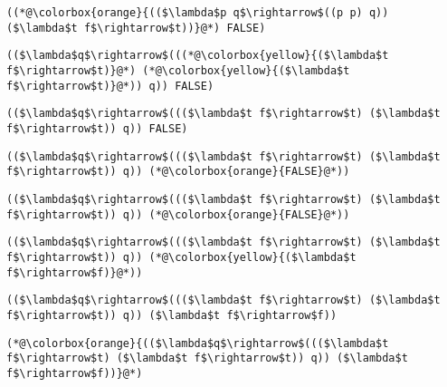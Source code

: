 \documentclass{beamer}
\begin{document}
\begin{frame}[fragile]{\CurrentSection}
\lstset{basicstyle=\ttfamily\small}\lstset{numbers=none}\lstset{language=ML}\begin{lstlisting}
((*@\colorbox{orange}{(($\lambda$p q$\rightarrow$((p p) q)) ($\lambda$t f$\rightarrow$t))}@*) FALSE)
\end{lstlisting}
\pause\lstset{language=ML}\begin{lstlisting}
(($\lambda$q$\rightarrow$(((*@\colorbox{yellow}{($\lambda$t f$\rightarrow$t)}@*) (*@\colorbox{yellow}{($\lambda$t f$\rightarrow$t)}@*)) q)) FALSE)
\end{lstlisting}

\end{frame}

\begin{frame}[fragile]{\CurrentSection}
\lstset{basicstyle=\ttfamily\small}\lstset{numbers=none}\lstset{language=ML}\begin{lstlisting}
(($\lambda$q$\rightarrow$((($\lambda$t f$\rightarrow$t) ($\lambda$t f$\rightarrow$t)) q)) FALSE)
\end{lstlisting}
\pause\lstset{language=ML}\begin{lstlisting}
(($\lambda$q$\rightarrow$((($\lambda$t f$\rightarrow$t) ($\lambda$t f$\rightarrow$t)) q)) (*@\colorbox{orange}{FALSE}@*))
\end{lstlisting}

\end{frame}

\begin{frame}[fragile]{\CurrentSection}
\lstset{basicstyle=\ttfamily\small}\lstset{numbers=none}\lstset{language=ML}\begin{lstlisting}
(($\lambda$q$\rightarrow$((($\lambda$t f$\rightarrow$t) ($\lambda$t f$\rightarrow$t)) q)) (*@\colorbox{orange}{FALSE}@*))
\end{lstlisting}
\pause\lstset{language=ML}\begin{lstlisting}
(($\lambda$q$\rightarrow$((($\lambda$t f$\rightarrow$t) ($\lambda$t f$\rightarrow$t)) q)) (*@\colorbox{yellow}{($\lambda$t f$\rightarrow$f)}@*))
\end{lstlisting}

\end{frame}

\begin{frame}[fragile]{\CurrentSection}
\lstset{basicstyle=\ttfamily\small}\lstset{numbers=none}\lstset{language=ML}\begin{lstlisting}
(($\lambda$q$\rightarrow$((($\lambda$t f$\rightarrow$t) ($\lambda$t f$\rightarrow$t)) q)) ($\lambda$t f$\rightarrow$f))
\end{lstlisting}
\pause\lstset{language=ML}\begin{lstlisting}
(*@\colorbox{orange}{(($\lambda$q$\rightarrow$((($\lambda$t f$\rightarrow$t) ($\lambda$t f$\rightarrow$t)) q)) ($\lambda$t f$\rightarrow$f))}@*)
\end{lstlisting}

\end{frame}
\end{document}
